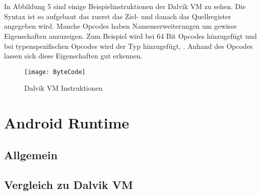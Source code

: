 \documentclass[11pt,conference,a4paper]{IEEEtran}
\begin{document}
\\
\\
In Abbildung 5 sind einige Beispielinstruktionen der Dalvik VM zu sehen. Die Syntax ist so aufgebaut das zuerst das Ziel- und danach das Quellregister angegeben wird. Manche Opcodes haben Namenserweiterungen um gewisse Eigenschaften anzuzeigen. Zum Beispiel wird bei 64 Bit Opcodes  hinzugefügt und bei typenspezifischen Opcodes wird der Typ hinzugefügt, .
Anhand des  Opcodes lassen sich diese Eigenschaften gut erkennen.

\begin{figure}
\centering
\texttt{[image: ByteCode]}
\caption{Dalvik VM Instruktionen\cite{2}}
\label{fig:ByteCode}
\end{figure}


\section{Android Runtime}

\subsection{Allgemein}

\subsection{Vergleich zu Dalvik VM}




\end{document}
